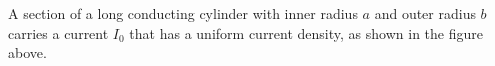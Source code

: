 \documentclass{../../../oss-apphys-exam}
\begin{document}
\begin{questions}
%            
%            
%
%      
%
%
%    
%
  
  \question A section of a long conducting cylinder with inner radius $a$ and
  outer radius $b$ carries a current $I_0$ that has a uniform current density,
  as shown in the figure above.
  \begin{parts}

\end{parts}
\end{questions}
\end{document}
